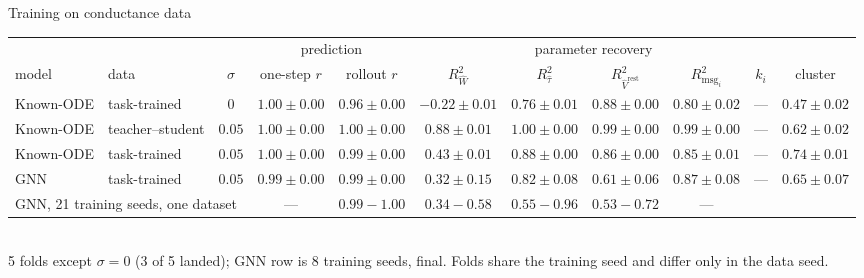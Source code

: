 \documentclass[aspectratio=169]{beamer}
\newcommand{\good}[1]{\textcolor{goodgreen}{#1}}
\newcommand{\bad}[1]{\textcolor{badred}{#1}}
\begin{document}
\begin{frame}{Training on conductance data}
\vspace*{0.35cm}
\centering\tiny
\setlength{\tabcolsep}{3pt}
\begin{tabular}{llccccccccc}
\toprule
 & & & \multicolumn{2}{c}{prediction} & \multicolumn{5}{c}{parameter recovery} & \\
\cmidrule(lr){4-5}\cmidrule(lr){6-10}
model & data & $\sigma$ & one-step $r$ & rollout $r$
  & $R^2_{\hat W}$ & $R^2_{\hat\tau}$ & $R^2_{\hat V^{\mathrm{rest}}}$
  & $R^2_{\mathrm{msg}_i}$ & $k_i$ & cluster \\
\midrule
Known-ODE & task-trained & $0$
  & \good{$1.00{\pm}0.00$} & \good{$0.96{\pm}0.00$}
  & \bad{$-0.22{\pm}0.01$} & $0.76{\pm}0.01$ & $0.88{\pm}0.00$ & $0.80{\pm}0.02$ & \multicolumn{1}{c}{---} & $0.47{\pm}0.02$ \\
\midrule
Known-ODE & teacher--student & $0.05$
  & \good{$1.00{\pm}0.00$} & \good{$1.00{\pm}0.00$}
  & \good{$0.88{\pm}0.01$} & \good{$1.00{\pm}0.00$} & \good{$0.99{\pm}0.00$} & \good{$0.99{\pm}0.00$} & \multicolumn{1}{c}{---} & $0.62{\pm}0.02$ \\
Known-ODE & task-trained & $0.05$
  & \good{$1.00{\pm}0.00$} & \good{$0.99{\pm}0.00$}
  & $\mathbf{0.43{\pm}0.01}$ & $0.88{\pm}0.00$ & $0.86{\pm}0.00$ & $0.85{\pm}0.01$ & \multicolumn{1}{c}{---} & $0.74{\pm}0.01$ \\
GNN & task-trained & $0.05$
  & \good{$0.99{\pm}0.00$} & \good{$0.99{\pm}0.00$}
  & $\mathbf{0.32{\pm}0.15}$ & $0.82{\pm}0.08$ & $0.61{\pm}0.06$ & $0.87{\pm}0.08$ & \multicolumn{1}{c}{---} & $0.65{\pm}0.07$ \\
\midrule
\multicolumn{3}{l}{GNN, 21 training seeds, one dataset}
  & \multicolumn{1}{c}{---} & \good{$0.99 - 1.00$}
  & $\mathbf{0.34 - 0.58}$ & $0.55 - 0.96$ & $0.53 - 0.72$ & \multicolumn{1}{c}{---} \\
\bottomrule
\end{tabular}\\[5pt]
{\tiny 5 folds except $\sigma = 0$ (3 of 5 landed); GNN row is 8 training seeds,
final. Folds share the training seed and differ only in the data seed.}
\end{frame}
\end{document}
